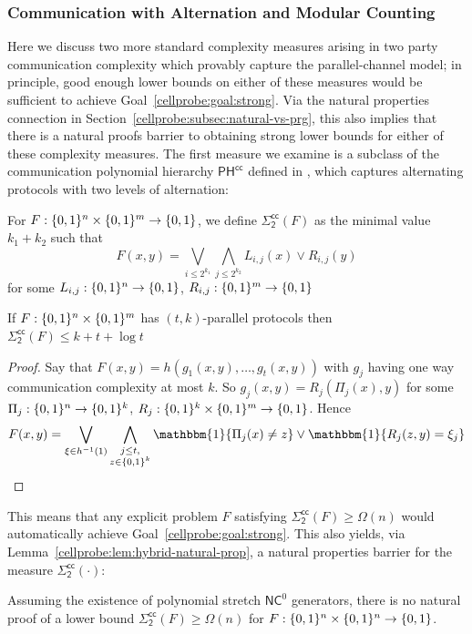 \subsubsection{Communication with Alternation and Modular Counting}
Here we discuss two more standard complexity measures arising in two party communication complexity which provably capture the parallel-channel model; in principle, good enough lower bounds on either of these measures would be sufficient to achieve Goal~\ref{cellprobe:goal:strong}. Via the natural properties connection in Section~\ref{cellprobe:subsec:natural-vs-prg}, this also implies that there is a natural proofs barrier to obtaining strong lower bounds for either of these complexity measures. The first measure we examine is a subclass of the communication polynomial hierarchy $\mathsf{PH^{cc}}$ defined in \cite{babai1986complexity}, which captures alternating protocols with two levels of alternation:
\begin{definition}
For $F: \{0,1\}^n \times \{0,1\}^m \to \{0,1\}$, we define $\mathsf{\Sigma_2^{cc}}(F)$ as the minimal value $k_1 + k_2$ such that
\[
F(x,y) = \bigvee_{i \leq 2^{k_1}} \bigwedge_{j \leq 2^{k_2}} L_{i,j}(x) \lor R_{i,j}(y)
\]
for some $L_{i,j}:\{0,1\}^n\to \{0,1\}$, $R_{i,j}: \{0,1\}^m \to \{0,1\}$
\end{definition}
\begin{lemma}\label{cellprobe:lem:sigma_2}
If $F:\{0,1\}^n \times \{0,1\}^m$ has $(t,k)$-parallel protocols then $\mathsf{\Sigma_2^{cc}}(F) \leq k + t + \log t$ 
\end{lemma}
\begin{proof}
Say that $F(x,y) = h(g_1(x,y),\ldots,g_t(x,y))$ with $g_j$ having one way communication complexity at most $k$. So $g_j(x,y) = R_j(\Pi_j(x),y)$ for some $\Pi_j: \{0,1\}^n \to \{0,1\}^k$, $R_j: \{0,1\}^k \times \{0,1\}^m \to \{0,1\}$. Hence
\[
F(x,y)=\bigvee_{\xi \in h^{-1}(1)} \bigwedge_{\substack{j \leq t,\\ z \in \B^k}} \mathbbm{1}\{\Pi_j(x) \neq z\} \lor \mathbbm{1}\{R_j(z,y) = \xi_j\}
\]
\end{proof}

This means that any explicit problem $F$ satisfying $\mathsf{\Sigma_2^{cc}}(F)\geq \Omega(n)$ would automatically achieve Goal~\ref{cellprobe:goal:strong}. This also yields, via Lemma~\ref{cellprobe:lem:hybrid-natural-prop}, a natural properties barrier for the measure $\mathsf{\Sigma_2^{cc}}(\cdot)$:
\begin{lemma}
Assuming the existence of polynomial stretch $\mathsf{NC}^0$ generators, there is no natural proof of a lower bound $\mathsf{\Sigma_2^{cc}}(F) \geq \Omega(n)$ for $F: \{0,1\}^n \times \{0,1\}^{n} \to \{0,1\}$.
\end{lemma}

